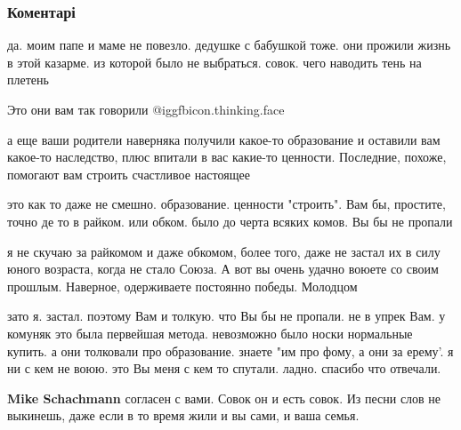  
 
 
 
 
\subsubsection{Коментарі}
\label{sec:05_07_2018.fb.lesev_igor.1.o_sovke.cmt}

\begin{itemize} %

да. моим папе и маме не повезло. дедушке с бабушкой тоже. они прожили жизнь в
этой казарме. из которой было не выбраться. совок. чего наводить тень на
плетень

\begin{itemize} %
Это они вам так говорили @igg{fbicon.thinking.face} 


а еще ваши родители наверняка получили какое-то образование и оставили вам
какое-то наследство, плюс впитали в вас какие-то ценности. Последние, похоже,
помогают вам строить счастливое настоящее


это как то даже не смешно. образование. ценности "строить". Вам бы, простите,
точно де то в райком. или обком. было до черта всяких комов. Вы бы не пропали


я не скучаю за райкомом и даже обкомом, более того, даже не застал их в силу
юного возраста, когда не стало Союза. А вот вы очень удачно воюете со своим
прошлым. Наверное, одерживаете постоянно победы. Молодцом


зато я. застал. поэтому Вам и толкую. что Вы бы не пропали. не в упрек Вам. у
комуняк это была первейшая метода. невозможно было носки нормальные купить. а
они толковали про образование. знаете "им про фому, а они за ерему'. я ни с кем
не воюю. это Вы меня с кем то спутали. ладно. спасибо что отвечали.

\textbf{Mike Schachmann} согласен с вами. Совок он и есть совок. Из песни слов не выкинешь, даже если в то время жили и вы сами, и ваша семья.


\end{itemize}
\end{itemize}
